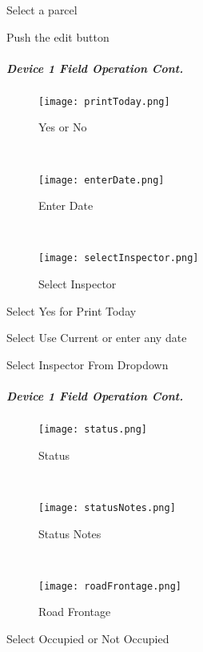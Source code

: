 \documentclass[class=book , crop=false, titlepage, twoside, multi={itemize, figure, verbatim}, float=false]{standalone}
\begin{document}

Select a parcel

\vspace{4in}

{\normalsize Push the} {\Large edit} {\normalsize button}
\clearpage
%
%
%
\subparagraph*{Device 1 Field Operation Cont.}
%
%
\begin{wrapfigure}{r}{0.4\textwidth}
\centering
\texttt{[image: printToday.png]}
\caption {Yes or No}
\vspace{.05in}

\HRule \\[.4cm] %
\vspace{.05in}

\texttt{[image: enterDate.png]}
\caption{Enter Date}
\vspace{.05in}

\HRule \\[.4cm] %
\vspace{.05in}

\texttt{[image: selectInspector.png]}
\caption{Select Inspector}
\end{wrapfigure}
Select Yes for Print Today
\vspace{2.5in}

\noindent Select Use Current or enter any date
\vspace{2in}

\noindent Select Inspector From Dropdown
\clearpage
%
%
%
\subparagraph*{Device 1 Field Operation Cont.}
%
%
\begin{wrapfigure}{r}{0.4\textwidth}
\centering
\texttt{[image: status.png]}
\caption {Status}
\vspace{.05in}

\HRule \\[.4cm] %
\vspace{.05in}

\texttt{[image: statusNotes.png]}
\caption{Status Notes}
\vspace{.05in}

\HRule \\[.4cm] %
\vspace{.05in}

\texttt{[image: roadFrontage.png]}
\caption{Road Frontage}
\end{wrapfigure}
Select Occupied or Not Occupied
\vspace{2.5in}
\end{document}
